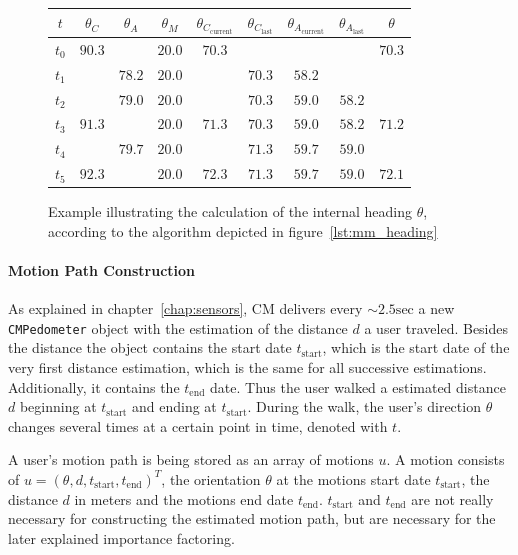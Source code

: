 \begin{figure}
\begin{tabular}{c|ccc|c|ccc||c}
\textbf{$t$} & \textbf{$\theta_C$} & \textbf{$\theta_A$} & \textbf{$\theta_M$} & $\theta_{C_\text{current}}$ & $\theta_{C_\text{last}}$ & $\theta_{A_\text{current}}$ & $\theta_{A_\text{last}}$ & \textbf{$\theta$}\\
\hline
$t_0$ & $90.3$ & & $20.0$ & $70.3$ & & & & $70.3$\\
$t_1$ & & $78.2$ & $20.0$ & & $70.3$ & $58.2$ & &\\
$t_2$ & & $79.0$ & $20.0$ & & $70.3$ & $59.0$ & $58.2$ &\\
$t_3$ & $91.3$ & & $20.0$ & $71.3$ & $70.3$ & $59.0$ & $58.2$ & $71.2$\\
$t_4$ & & $79.7$ & $20.0$ & & $71.3$ & $59.7$ & $59.0$ &\\
$t_5$ & $92.3$ & & $20.0$ & $72.3$ & $71.3$ & $59.7$ & $59.0$ & $72.1$\\

\end{tabular}
\caption{Example illustrating the calculation of the internal heading $\theta$, according to the algorithm depicted in figure~\ref{lst:mm_heading}}
\label{tab:mm_heading}
\end{figure}

\paragraph{Motion Path Construction}
As explained in chapter~\ref{chap:sensors}, \acs{CM} delivers every $\sim 2.5\text{sec}$ a new \texttt{CMPedometer} object with the estimation of the distance $d$ a user traveled. Besides the distance the object contains the start date $t_\text{start}$, which is the start date of the very first distance estimation, which is the same for all successive estimations. Additionally, it contains the $t_\text{end}$ date. Thus the user walked a estimated distance $d$ beginning at $t_\text{start}$ and ending at $t_\text{start}$.
During the walk, the user's direction $\theta$ changes several times at a certain point in time, denoted with $t$.

A user's motion path is being stored as an array of motions $u$. A motion consists of $u = (\theta, d, t_\text{start}, t_\text{end})^T$, the orientation $\theta$ at the motions start date $t_\text{start}$, the distance $d$ in meters and the motions end date $t_\text{end}$. $t_\text{start}$ and $t_\text{end}$ are not really necessary for constructing the estimated motion path, but are necessary for the later explained importance factoring.

